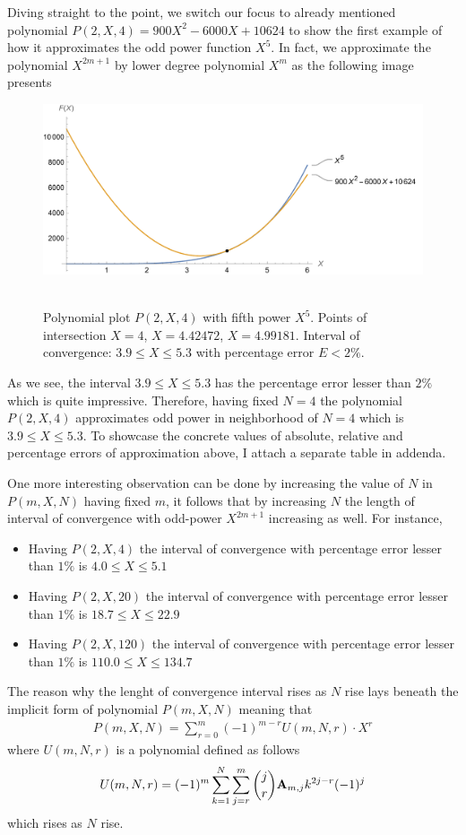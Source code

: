 Diving straight to the point, we switch our focus to already mentioned polynomial $P(2,X,4) = 900X^2 - 6000X + 10624$
to show the first example of how it approximates the odd power function $X^5$.
In fact, we approximate the polynomial $X^{2m+1}$ by lower degree polynomial $X^m$ as the following image presents
\begin{figure}[H]
    \centering
    \includegraphics[width=1\textwidth]{sections/images/03_plots_polynomial_p2_n4_with_fifth}
    ~\caption{Polynomial plot $P(2, X, 4)$ with fifth power $X^5$.
    Points of intersection $X=4$, $X=4.42472$, $X=4.99181$.
    Interval of convergence: $3.9 \leq X \leq 5.3$ with percentage error $E < 2\%$.
    }\label{fig:03_plots_polynomial_p2_n4_with_fifth}
\end{figure}
As we see, the interval $3.9 \leq X \leq 5.3$ has the percentage error lesser than $2\%$ which is quite impressive.
Therefore, having fixed $N=4$ the polynomial $P(2, X, 4)$ approximates odd power in neighborhood of $N=4$
which is $3.9 \leq X \leq 5.3$.
To showcase the concrete values of absolute, relative and percentage errors of approximation above, I attach a separate
table in addenda.

One more interesting observation can be done by increasing the value of $N$ in $P(m, X, N)$ having fixed $m$, it
follows that by increasing $N$ the length of interval of convergence with odd-power $X^{2m+1}$ increasing as well.
For instance,
\begin{itemize}
    \item Having $P(2, X, 4)$ the interval of convergence with percentage error lesser than $1\%$ is $4.0 \leq X \leq 5.1$
    \item Having $P(2, X, 20)$ the interval of convergence with percentage error lesser than $1\%$ is $18.7 \leq X \leq 22.9$
    \item Having $P(2, X, 120)$ the interval of convergence with percentage error lesser than $1\%$ is $110.0 \leq X \leq 134.7$
\end{itemize}
The reason why the lenght of convergence interval rises as $N$ rise lays beneath the implicit form of polynomial $P(m,X,N)$
meaning that
\begin{align*}
    P(m,X,N) = \sum_{r=0}^{m} (-1)^{m-r} U(m, N, r) \cdot X^{r}
\end{align*}
where $U(m, N, r)$ is a polynomial defined as follows
\begin{align*}
    U(m, N, r) = (-1)^m \sum_{k=1}^{N} \sum_{j=r}^{m} \binom{j}{r} {\mathbf{A}} \sb{m,j} k^{2j-r} (-1)^j
\end{align*}
which rises as $N$ rise.

